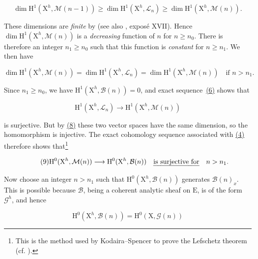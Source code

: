 \begin{equation*}\tag{7}
\dim\mathrm{H}^1(\mathrm{X}^h,\mathcal{M}(n-1))
\geqslant
\dim\mathrm{H}^1(\mathrm{X}^h,\mathcal{L}_n)
\geqslant
\dim\mathrm{H}^1(\mathrm{X}^h,\mathcal{M}(n)).
\end{equation*}

These dimensions are \emph{finite} by  (see also , exposé XVII). Hence $\dim\mathrm{H}^1(\mathrm{X}^h,\mathcal{M}(n))$ is a \emph{decreasing} function of $n$ for $n\geqslant n_0$. There is therefore an integer $n_1\geqslant n_0$ such that this function is \emph{constant} for $n\geqslant n_1$. We then have

\begin{equation*}\tag{8}
\dim\mathrm{H}^1(\mathrm{X}^h,\mathcal{M}(n))
=
\dim\mathrm{H}^1(\mathrm{X}^h,\mathcal{L}_n)
=
\dim\mathrm{H}^1(\mathrm{X}^h,\mathcal{M}(n))
\quad\text{if }n>n_1.
\end{equation*}

Since $n_1\geqslant n_0$, we have $\mathrm{H}^1(\mathrm{X}^h,\mathcal{B}(n))=0$, and exact sequence~\hyperref[gaga:eq:6]{(6)} shows that

\begin{equation*}
\mathrm{H}^1(\mathrm{X}^h,\mathcal{L}_n)
\longrightarrow
\mathrm{H}^1(\mathrm{X}^h,\mathcal{M}(n))
\end{equation*}

is surjective. But by \hyperref[gaga:eq:8]{(8)} these two vector spaces have the same dimension, so the homomorphism is injective. The exact cohomology sequence associated with \hyperref[gaga:eq:4]{(4)} therefore shows that\footnote{This is the method used by Kodaira--Spencer to prove the Lefschetz theorem (cf. ).}

\begin{equation*}\tag{9}
\mathrm{H}^0(\mathrm{X}^h,\mathcal{M}(n))
\longrightarrow
\mathrm{H}^0(\mathrm{X}^h,\mathcal{B}(n))
\quad\text{\emph{is surjective for}}\quad n>n_1.
\end{equation*}

Now choose an integer $n>n_1$ such that $\mathrm{H}^0(\mathrm{X}^h,\mathcal{B}(n))$ generates $\mathcal{B}(n)_x$. This is possible because $\mathcal{B}$, being a coherent analytic sheaf on $\mathrm{E}$, is of the form $\mathcal{G}^h$, and hence

\begin{equation*}
\mathrm{H}^0(\mathrm{X}^h,\mathcal{B}(n))
=
\mathrm{H}^0(\mathrm{X},\mathcal{G}(n))
\end{equation*}

